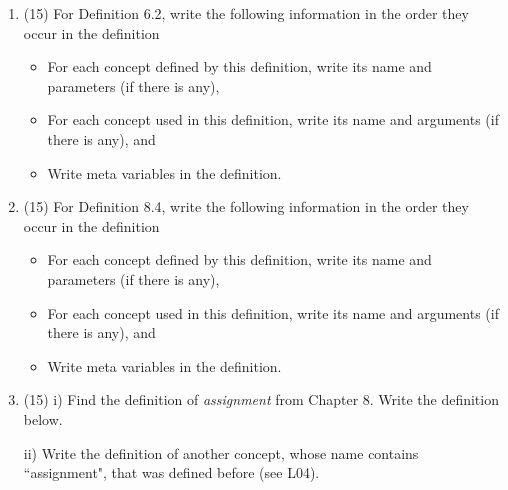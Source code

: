 \documentclass[12pt, letterpaper]{article}
\begin{document}
\begin{enumerate}
\item (15)  For Definition 6.2,  write the following information in the order they occur in the definition
\begin{itemize}
 	\item For each concept defined by this definition, write its name and parameters (if there is any), 
 	\item For each concept used in this definition, write its name and  arguments   (if there is any), and
 	\item  Write meta variables in the definition.
 	
\end{itemize}
 
\item (15) For Definition 8.4,  write the following information in the order they occur in the definition
\begin{itemize}
 	\item For each concept defined by this definition, write its name and parameters (if there is any), 
 	\item For each concept used in this definition, write its name and  arguments   (if there is any), and
 	\item Write meta variables in the definition.
 	
\end{itemize}
 


\item (15)  i) Find the definition of {\em assignment} from Chapter 8. Write the definition below. 

ii) Write the definition of another concept, whose name contains ``assignment", that was defined before (see L04). 


\end{enumerate}
\end{document}
